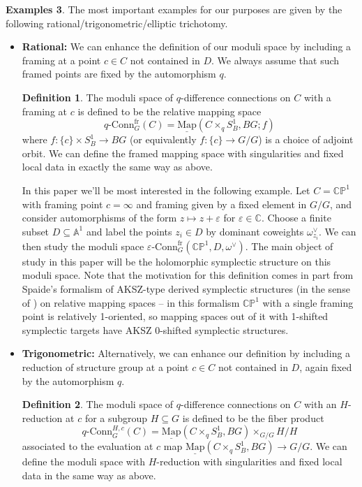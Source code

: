 \documentclass[11pt, oneside, reqno]{amsart}
\theoremstyle{definition} \newtheorem{definition}{Definition}[section]
\theoremstyle{definition} \newtheorem{remark}[definition]{Remark}
\theoremstyle{definition} \newtheorem{remarks}[definition]{Remarks}
\theoremstyle{definition} \newtheorem{question}[definition]{Question}
\theoremstyle{definition} \newtheorem*{note}{Note}
\theoremstyle{definition} \newtheorem{example}[definition]{Example}
\theoremstyle{definition} \newtheorem{examples}[definition]{Examples}
\newcommand{\bb}[1]{\mathbb{#1}}
\newcommand{\mr}[1]{\mathrm{#1}}
\newcommand{\ul}[1]{\underline{#1}}
\newcommand{\CC}{\mathbb{C}}
\newcommand{\eps}{\varepsilon}
\newcommand{\sub}{\subseteq}
\newcommand{\map}{\ul{\mr{Map}}}
\newcommand{\qconn}{q\text{-Conn}}
\newcommand{\epsconn}{\varepsilon\text{-Conn}}
\newcommand{\fr}{\mathrm{fr}}
\begin{document}
\begin{examples}
The most important examples for our purposes are given by the following rational/trigonometric/elliptic trichotomy.
 \begin{itemize}
  \item \textbf{Rational:} We can enhance the definition of our moduli space by including a framing at a point $c \in C$ not contained in $D$.  We always assume that such framed points are fixed by the automorphism $q$.
    \begin{definition}
      \label{def:framing}
    The moduli space of $q$-difference connections on $C$ with a framing at $c$ is defined to be the relative mapping space 
    \[\qconn_G^\fr(C) = \map(C \times_q S^1_B, BG; f)\]
    where $f \colon \{c\} \times S^1_B \to BG$ (or equivalently $f \colon \{c\} \to G/G$) is a choice of adjoint orbit.  We can define the framed mapping space with singularities and fixed local data in exactly the same way as above.  
  \end{definition}
    
  In this paper we'll be most interested in the following example.  Let $C = \bb{CP}^1$ with framing point $c = \infty$ and framing given by a fixed element in $G/G$, and consider automorphisms of the form $z \mapsto z + \eps$ for $\eps \in \CC$.  Choose a finite subset $D \sub \bb A^1$ and label the points $z_i \in D$ by dominant coweights $\omega^\vee_{z_i}$.  We can then study the moduli space $\epsconn^\fr_G(\bb{CP}^1,D, \omega^\vee)$.  The main object of study in this paper will be the holomorphic symplectic structure on this moduli space. Note that the motivation for this definition comes in part from
    Spaide's formalism \cite{Spaide} of AKSZ-type derived symplectic structures (in the sense of \cite{AKSZ,PTVV}) on
    relative mapping spaces -- in this formalism $\bb{CP}^1$ with a
    single framing point is relatively 1-oriented, so mapping spaces
    out of it with 1-shifted symplectic targets have AKSZ 0-shifted
    symplectic structures.
  
  \item \textbf{Trigonometric:} Alternatively, we can enhance our definition by including a reduction of structure group at a point $c \in C$ not contained in $D$, again fixed by the automorphism $q$.
  \begin{definition}
   The moduli space of $q$-difference connections on $C$ with an $H$-reduction at $c$ for a subgroup $H \sub G$ is defined to be the fiber product
   \[\qconn_G^{H,c}(C) = \map(C \times_q S^1_B,BG) \times_{G/G} H/H\]
   associated to the evaluation at $c$ map $\map(C \times_q S^1_B,BG) \to G/G$.  We can define the moduli space with $H$-reduction with singularities and fixed local data in the same way as above.
  \end{definition}
  

\end{itemize}
\end{examples}
\end{document}
